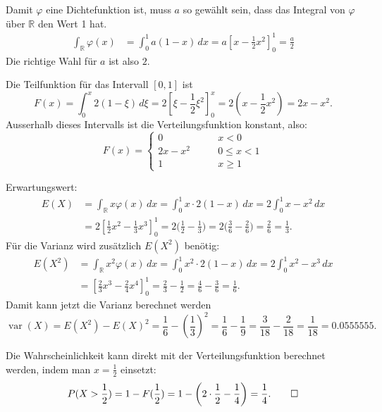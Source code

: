 \begin{loesung}
\begin{teilaufgaben}
\item
Damit $\varphi$ eine Dichtefunktion ist, muss $a$ so gewählt sein,
dass das Integral von $\varphi$ über $\mathbb R$ den Wert 1 hat.
\begin{align*}
\int_{\mathbb R}\varphi(x)
&=
\int_{0}^{1}a(1-x)\,dx=a\left[x-\frac12x^2\right]_0^1
=
\frac{a}2
\end{align*}
Die richtige Wahl für $a$ ist also $2$.
\item
Die Teilfunktion für das Intervall $[0,1]$ ist
\[
F(x)=\int_{0}^x 2(1-\xi)\,d\xi
=
2\left[\xi - \frac12\xi^2\right]_0^x
=
2(x-\frac12x^2)
=
2x-x^2.
\]
Ausserhalb dieses Intervalls ist die Verteilungsfunktion konstant, also:
\[
F(x)=\begin{cases}
0&\qquad x < 0\\
2x-x^2
&\qquad 0 \le x < 1\\
1&\qquad x\ge1
\end{cases}
\]
\item
Erwartungswert:
\begin{align*}
E(X)&=\int_{\mathbb R} x\varphi(x)\,dx
=
\int_0^1x\cdot 2(1-x)\,dx
=
2\int_0^1 x-x^2\,dx
\\
&=
2\left[\frac12x^2-\frac13x^3\right]_0^1
=2\biggl(\frac12-\frac13\biggr)
=2\biggl(\frac3{6}-\frac{2}{6}\biggr)
=\frac2{6}=\frac13.
\end{align*}
Für die Varianz wird zusätzlich $E(X^2)$ benötig:
\begin{align*}
E(X^2)
&=
\int_{\mathbb R} x^2\varphi(x)\,dx
=
\int_0^1x^2\cdot 2(1-x)\,dx
=
2\int_0^1 x^2-x^3\,dx
\\
&=\left[\frac23x^3-\frac24x^4\right]_0^1
=\frac23-\frac12=\frac4{6}-\frac{3}{6}=\frac{1}{6}.
\end{align*}
Damit kann jetzt die Varianz berechnet werden
\[
\operatorname{var}(X)=E(X^2)-E(X)^2=\frac{1}{6}-\left(\frac{1}{3}\right)^2
=\frac16-\frac19=\frac3{18}-\frac2{18}
=\frac{1}{18}=0.0555555.
\]
\item
Die Wahrscheinlichkeit kann direkt mit der Verteilungsfunktion
berechnet werden, indem man $x=\frac12$ einsetzt:
\[
P(X>\frac12)
=
1-F(\frac12)=1-\biggl(2\cdot \frac12-\frac14\biggr)=\frac14.
\qedhere
\]
\end{teilaufgaben}
\end{loesung}

